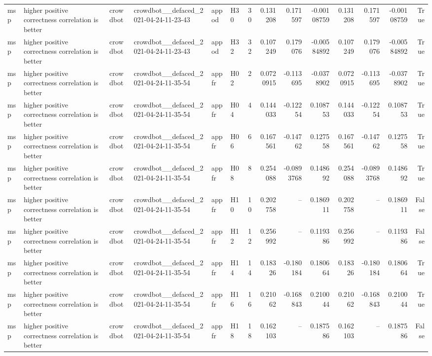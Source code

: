 \begin{longtable}{llllllrrrrrrrr}
msp & higher positive correctness correlation is better & crowdbot & crowdbot\_\_defaced\_2021-04-24-11-23-43 & appod & H30 & 30 & 0.131208 & 0.171597 & -0.00108759 & 0.131208 & 0.171597 & -0.00108759 & True \\
msp & higher positive correctness correlation is better & crowdbot & crowdbot\_\_defaced\_2021-04-24-11-23-43 & appod & H32 & 32 & 0.107249 & 0.179076 & -0.00584892 & 0.107249 & 0.179076 & -0.00584892 & True \\
msp & higher positive correctness correlation is better & crowdbot & crowdbot\_\_defaced\_2021-04-24-11-35-54 & appfr & H02 & 2 & 0.0720915 & -0.113695 & -0.0378902 & 0.0720915 & -0.113695 & -0.0378902 & True \\
msp & higher positive correctness correlation is better & crowdbot & crowdbot\_\_defaced\_2021-04-24-11-35-54 & appfr & H04 & 4 & 0.144033 & -0.12254 & 0.108753 & 0.144033 & -0.12254 & 0.108753 & True \\
msp & higher positive correctness correlation is better & crowdbot & crowdbot\_\_defaced\_2021-04-24-11-35-54 & appfr & H06 & 6 & 0.167561 & -0.14762 & 0.127558 & 0.167561 & -0.14762 & 0.127558 & True \\
msp & higher positive correctness correlation is better & crowdbot & crowdbot\_\_defaced\_2021-04-24-11-35-54 & appfr & H08 & 8 & 0.254088 & -0.0893768 & 0.148692 & 0.254088 & -0.0893768 & 0.148692 & True \\
msp & higher positive correctness correlation is better & crowdbot & crowdbot\_\_defaced\_2021-04-24-11-35-54 & appfr & H10 & 10 & 0.202758 & -- & 0.186911 & 0.202758 & -- & 0.186911 & False \\
msp & higher positive correctness correlation is better & crowdbot & crowdbot\_\_defaced\_2021-04-24-11-35-54 & appfr & H12 & 12 & 0.256992 & -- & 0.119386 & 0.256992 & -- & 0.119386 & False \\
msp & higher positive correctness correlation is better & crowdbot & crowdbot\_\_defaced\_2021-04-24-11-35-54 & appfr & H14 & 14 & 0.18326 & -0.180184 & 0.180664 & 0.18326 & -0.180184 & 0.180664 & True \\
msp & higher positive correctness correlation is better & crowdbot & crowdbot\_\_defaced\_2021-04-24-11-35-54 & appfr & H16 & 16 & 0.21062 & -0.168843 & 0.210044 & 0.21062 & -0.168843 & 0.210044 & True \\
msp & higher positive correctness correlation is better & crowdbot & crowdbot\_\_defaced\_2021-04-24-11-35-54 & appfr & H18 & 18 & 0.162103 & -- & 0.187586 & 0.162103 & -- & 0.187586 & False \\

\end{longtable}
